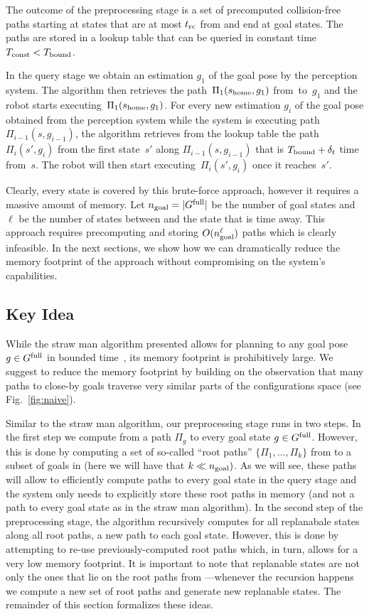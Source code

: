 \documentclass[a4paper]{report}
\begin{document}
The outcome of the preprocessing stage is a set of precomputed collision-free paths starting at states that are at most $t_{\textrm{rc}}$ from \Shome and end at goal states.
The paths are stored in a lookup table that can be queried in constant time $T_\textrm{const} < T_{\textrm{bound}}$.

In the query stage we obtain an estimation $g_1$ of the goal pose by the perception system. 
The algorithm then retrieves the path~$\Pi_1(s_{\textrm{home}},g_1)$ from~\Shome to~$g_1$ and the robot starts executing~$\Pi_1(s_{\textrm{home}},g_1)$.
%
For every new estimation $g_i$ of the goal pose obtained from the perception system  while the system is executing path $\Pi_{i-1}(s,g_{i-1})$, the algorithm retrieves from the lookup table the path $\Pi_i(s',g_i)$ from the first state~$s'$ along $\Pi_{i-1}(s,g_{i-1})$ that is $T_{\textrm{bound}} + \delta_t$ time from~$s$. The robot will then start executing~$\Pi_i(s',g_i)$ once it reaches~$s'$.

Clearly, every state is covered by this brute-force approach, however it requires a massive amount of memory.
Let $n_{\rm goal} = \vert G^{\textrm{full}} \vert$ be the number of goal states and
$\ell$ be the number of states between \Shome and the state that is \Trc time away.
This approach requires precomputing and storing $O(n_{\rm goal}^\ell)$ paths which is clearly infeasible.
In the next sections, we show how we can dramatically reduce the memory footprint of the approach without compromising on the system's capabilities.

\subsection{Key Idea}
While the straw man algorithm presented  allows for planning to any goal pose $ g \in G^{\textrm{full}}$ in bounded time~\Tbound, its memory footprint is prohibitively large.
%
We suggest to reduce the memory footprint by building on the observation that many paths to close-by goals traverse very similar parts of the configurations space (see Fig.~\ref{fig:naive}).

Similar to the straw man algorithm, our preprocessing stage runs in two steps.
In the first step we  compute from \Shome a path $\Pi_g$ to every goal state $ g \in G^{\textrm{full}}$. However, this is done by computing a set of so-called ``root paths'' $\{\Pi_1, \ldots, \Pi_k \}$ from \Shome to a subset of goals in \Gfull (here we will have that $k \ll n_{\rm goal})$. 
As we will see, these paths will allow to efficiently compute paths to every goal state in the query stage and the system only needs to explicitly store these root paths in memory (and not a path to every goal state as in the straw man algorithm).
%
In the second step of the preprocessing stage, the algorithm recursively computes for all replanabale states along all root paths, a new path to each goal state. However, this is done by attempting to re-use previously-computed root paths which, in turn, allows for a very low memory footprint.
%
It is important to note that replanable states are not only the ones that lie on the root paths from \Shome---whenever the recursion happens we compute a new set of root paths and generate new replanable states.
%
The remainder of this section formalizes these ideas.
\end{document}
